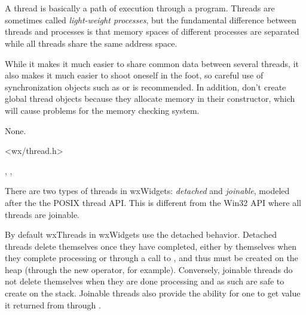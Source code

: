 \section{}\label{wxthread}

A thread is basically a path of execution through a program. Threads are
sometimes called {\it light-weight processes}, but the fundamental difference
between threads and processes is that memory spaces of different processes are
separated while all threads share the same address space. 

While it makes it much easier to share common data between several threads, it also 
makes it much easier to shoot oneself in the foot, so careful use of synchronization 
objects such as  or  is recommended. In addition, don't create global thread 
objects because they allocate memory in their constructor, which will cause 
problems for the memory checking system.


None.


<wx/thread.h>




, , 


\label{typeswxthread}

There are two types of threads in wxWidgets: {\it detached} and {\it joinable},
modeled after the the POSIX thread API. This is different from the Win32 API
where all threads are joinable. 

By default wxThreads in wxWidgets use the detached behavior. Detached threads
delete themselves once they have completed, either by themselves when they complete 
processing or through a call to , and thus 
must be created on the heap (through the new operator, for example). Conversely, 
joinable threads do not delete themselves when they are done processing and as such
are safe to create on the stack. Joinable threads also provide the ability
for one to get value it returned from 
through .

